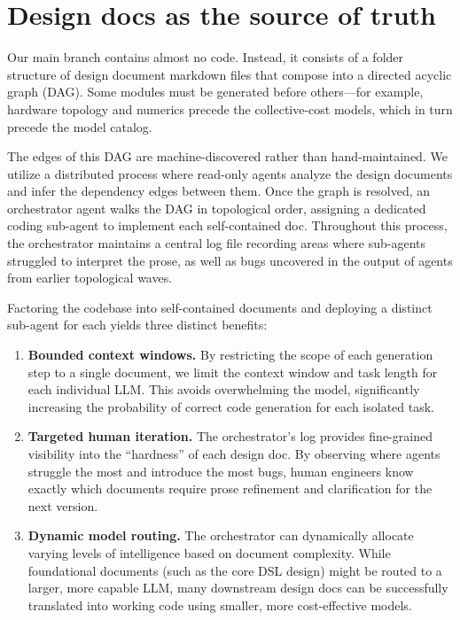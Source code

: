 \documentclass{article}
\begin{document}
\section{Design docs as the source of truth}
\label{sec:docs}
Our main branch contains almost no code. Instead, it consists of a folder
structure of design document markdown files that compose into a directed
acyclic graph (DAG). Some modules must be generated before others---for
example, hardware topology and numerics precede the collective-cost models,
which in turn precede the model catalog. 

The edges of this DAG are machine-discovered rather than hand-maintained. We
utilize a distributed process where read-only agents analyze the design
documents and infer the dependency edges between them. Once the graph is
resolved, an orchestrator agent walks the DAG in topological order,
assigning a dedicated coding sub-agent to implement each self-contained doc.
Throughout this process, the orchestrator maintains a central log file
recording areas where sub-agents struggled to interpret the prose, as well
as bugs uncovered in the output of agents from earlier topological waves.

Factoring the codebase into self-contained documents and deploying a distinct
sub-agent for each yields three distinct benefits:

\begin{enumerate}
\item \textbf{Bounded context windows.} By restricting the scope of each
generation step to a single document, we limit the context window and task
length for each individual LLM. This avoids overwhelming the model,
significantly increasing the probability of correct code generation for each
isolated task.
\item \textbf{Targeted human iteration.} The orchestrator's log provides
fine-grained visibility into the ``hardness'' of each design doc. By
observing where agents struggle the most and introduce the most bugs, human
engineers know exactly which documents require prose refinement and clarification
for the next version.
\item \textbf{Dynamic model routing.} The orchestrator can dynamically
allocate varying levels of intelligence based on document complexity. While
foundational documents (such as the core DSL design) might be routed to a
larger, more capable LLM, many downstream design docs can be successfully
translated into working code using smaller, more cost-effective models.
\end{enumerate}
\end{document}
